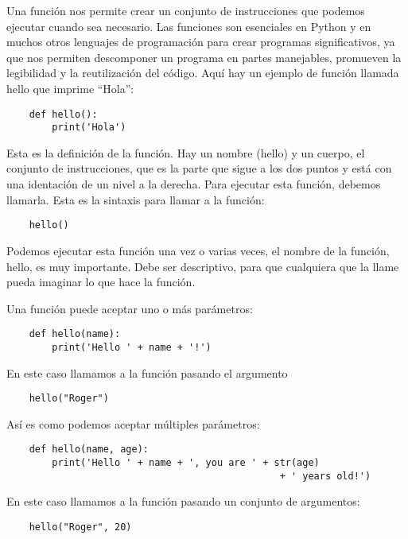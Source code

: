 \documentclass[12pt]{article}
\begin{document}
    Una función nos permite crear un conjunto de instrucciones que podemos ejecutar cuando sea necesario.
    Las funciones son esenciales en Python y en muchos otros lenguajes de programación para crear programas
    significativos, ya que nos permiten descomponer un programa en partes manejables, promueven la legibilidad y la
    reutilización del código.
    Aquí hay un ejemplo de función llamada hello que imprime ``Hola'':

    \begin{lstlisting}
    def hello():
        print('Hola')
    \end{lstlisting}

    Esta es la definición de la función.
    Hay un nombre (hello) y un cuerpo, el conjunto de instrucciones, que es la parte que sigue a los dos puntos y está
    con una identación de un nivel a la derecha.
    Para ejecutar esta función, debemos llamarla.
    Esta es la sintaxis para llamar a la función:

    \begin{lstlisting}
    hello()
    \end{lstlisting}

    Podemos ejecutar esta función una vez o varias veces, el nombre de la función, hello, es muy importante.
    Debe ser descriptivo, para que cualquiera que la llame pueda imaginar lo que hace la función.

    Una función puede aceptar uno o más parámetros:

    \begin{lstlisting}
    def hello(name):
        print('Hello ' + name + '!')
    \end{lstlisting}

    En este caso llamamos a la función pasando el argumento

    \begin{lstlisting}
    hello("Roger")
    \end{lstlisting}

    Así es como podemos aceptar múltiples parámetros:

    \begin{lstlisting}
    def hello(name, age):
        print('Hello ' + name + ', you are ' + str(age)
                                                + ' years old!')
    \end{lstlisting}

    En este caso llamamos a la función pasando un conjunto de argumentos:
    \begin{lstlisting}
    hello("Roger", 20)
    \end{lstlisting}
\end{document}
